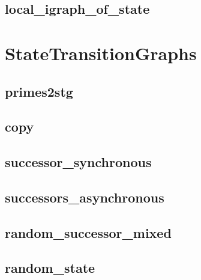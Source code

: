 \documentclass[letterpaper,10pt,english]{sphinxmanual}
\begin{document}
\subsection{local\_igraph\_of\_state}
\label{\detokenize{InteractionGraphs:local-igraph-of-state}}\label{\detokenize{InteractionGraphs:id18}}

\section{StateTransitionGraphs}
\label{\detokenize{StateTransitionGraphs:statetransitiongraphs}}\label{\detokenize{StateTransitionGraphs::doc}}\label{\detokenize{StateTransitionGraphs:id1}}

\subsection{primes2stg}
\label{\detokenize{StateTransitionGraphs:primes2stg}}\label{\detokenize{StateTransitionGraphs:id2}}

\subsection{copy}
\label{\detokenize{StateTransitionGraphs:stg-copy}}\label{\detokenize{StateTransitionGraphs:copy}}

\subsection{successor\_synchronous}
\label{\detokenize{StateTransitionGraphs:id3}}\label{\detokenize{StateTransitionGraphs:successor-synchronous}}

\subsection{successors\_asynchronous}
\label{\detokenize{StateTransitionGraphs:successors-asynchronous}}\label{\detokenize{StateTransitionGraphs:id4}}

\subsection{random\_successor\_mixed}
\label{\detokenize{StateTransitionGraphs:random-successor-mixed}}\label{\detokenize{StateTransitionGraphs:successor-random-mixed}}

\subsection{random\_state}
\label{\detokenize{StateTransitionGraphs:id5}}\label{\detokenize{StateTransitionGraphs:random-state}}
\end{document}
